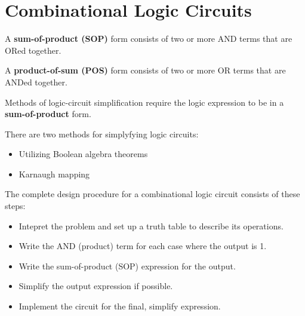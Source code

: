 \chapter{Combinational Logic Circuits}

    \par A \textbf{sum-of-product (SOP)} form consists of two or more AND terms
    that are ORed together.
    \par A \textbf{product-of-sum (POS)} form consists of two or more OR terms
    that are ANDed together.
    \par Methods of logic-circuit simplification require the logic expression
    to be in a \textbf{sum-of-product} form.

  \par There are two methods for simplyfying logic circuits:
  \begin{itemize}
    \item Utilizing Boolean algebra theorems
    \item Karnaugh mapping
  \end{itemize}

  \par The complete design procedure for a combinational logic circuit
    consists of these steps:
  \begin{itemize}
    \item Intepret the problem and set up a truth table to describe its
      operations.
    \item Write the AND (product) term for each case where the output is 1.
    \item Write the sum-of-product (SOP) expression for the output.
    \item Simplify the output expression if possible.
    \item Implement the circuit for the final, simplify expression.
  \end{itemize}

